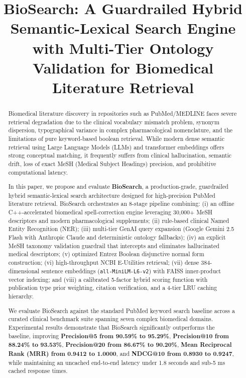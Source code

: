\documentclass[conference]{IEEEtran}
\begin{document}
\title{BioSearch: A Guardrailed Hybrid Semantic-Lexical Search Engine with Multi-Tier Ontology Validation for Biomedical Literature Retrieval}

\author{
}

\maketitle

\begin{abstract}
Biomedical literature discovery in repositories such as PubMed/MEDLINE faces severe retrieval degradation due to the clinical vocabulary mismatch problem, synonym dispersion, typographical variance in complex pharmacological nomenclature, and the limitations of pure keyword-based boolean retrieval. While modern dense semantic retrieval using Large Language Models (LLMs) and transformer embeddings offers strong conceptual matching, it frequently suffers from clinical hallucination, semantic drift, loss of exact MeSH (Medical Subject Headings) precision, and prohibitive computational latency. 

In this paper, we propose and evaluate \textbf{BioSearch}, a production-grade, guardrailed hybrid semantic-lexical search architecture designed for high-precision PubMed literature retrieval. BioSearch orchestrates an 8-stage pipeline combining: (i) an offline C++-accelerated biomedical spell-correction engine leveraging 30,000+ MeSH descriptors and modern pharmacological supplements; (ii) rule-based clinical Named Entity Recognition (NER); (iii) multi-tier GenAI query expansion (Google Gemini 2.5 Flash with Anthropic Claude and deterministic ontology fallbacks); (iv) an explicit MeSH taxonomy validation guardrail that intercepts and eliminates hallucinated medical descriptors; (v) optimized Entrez Boolean disjunctive normal form construction; (vi) high-throughput NCBI E-Utilities retrieval; (vii) dense 384-dimensional sentence embeddings (\texttt{all-MiniLM-L6-v2}) with FAISS inner-product vector indexing; and (viii) a calibrated 5-factor hybrid scoring function with publication type prior weighting, citation verification, and a 4-tier LRU caching hierarchy. 

We evaluate BioSearch against the standard PubMed keyword search baseline across a curated clinical benchmark suite spanning seven complex biomedical domains. Experimental results demonstrate that BioSearch significantly outperforms the baseline, improving \textbf{Precision@5 from 90.59\% to 95.29\%}, \textbf{Precision@10 from 88.24\% to 93.53\%}, \textbf{Precision@20 from 86.67\% to 90.20\%}, \textbf{Mean Reciprocal Rank (MRR) from 0.9412 to 1.0000}, and \textbf{NDCG@10 from 0.8930 to 0.9247}, while maintaining an uncached end-to-end latency under 1.8 seconds and sub-5 ms cached response times.
\end{abstract}
\end{document}
